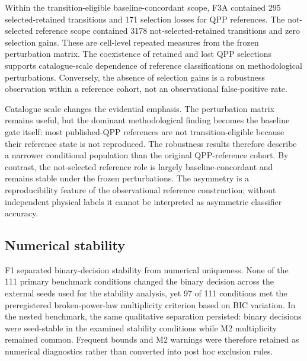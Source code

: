 \documentclass[manuscript,linenumbers]{aastex702}
\begin{document}
Within the transition-eligible baseline-concordant scope, F3A contained 295 selected-retained transitions and 171 selection losses for QPP references. The not-selected reference scope contained 3178 not-selected-retained transitions and zero selection gains. These are cell-level repeated measures from the frozen perturbation matrix. The coexistence of retained and lost QPP selections supports catalogue-scale dependence of reference classifications on methodological perturbations. Conversely, the absence of selection gains is a robustness observation within a reference cohort, not an observational false-positive rate.





Catalogue scale changes the evidential emphasis. The perturbation matrix remains useful, but the dominant methodological finding becomes the baseline gate itself: most published-QPP references are not transition-eligible because their reference state is not reproduced. The robustness results therefore describe a narrower conditional population than the original QPP-reference cohort. By contrast, the not-selected reference role is largely baseline-concordant and remains stable under the frozen perturbations. The asymmetry is a reproducibility feature of the observational reference construction; without independent physical labels it cannot be interpreted as asymmetric classifier accuracy.

\subsection{Numerical stability}
F1 separated binary-decision stability from numerical uniqueness. None of the 111 primary benchmark conditions changed the binary decision across the external seeds used for the stability analysis, yet 97 of 111 conditions met the preregistered broken-power-law multiplicity criterion based on BIC variation. In the nested benchmark, the same qualitative separation persisted: binary decisions were seed-stable in the examined stability conditions while M2 multiplicity remained common. Frequent bounds and M2 warnings were therefore retained as numerical diagnostics rather than converted into post hoc exclusion rules.
\end{document}
